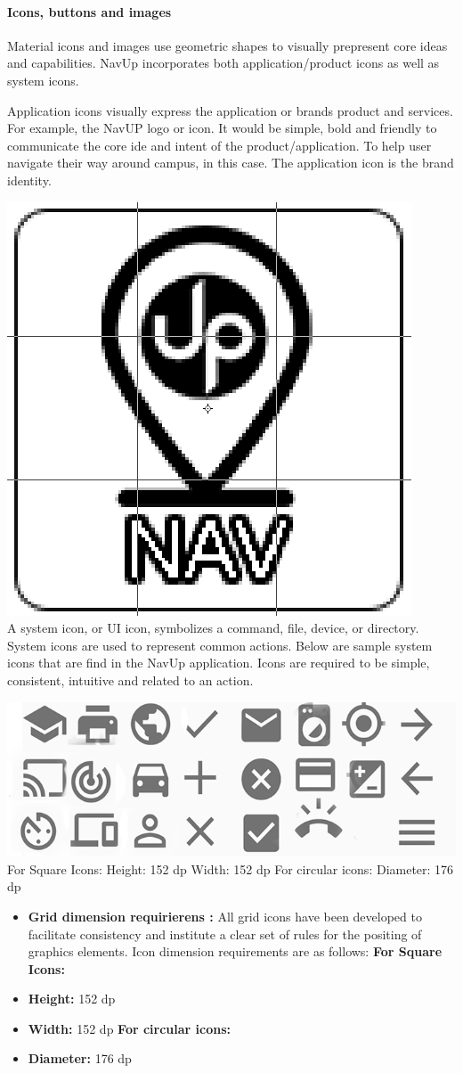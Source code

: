 \documentclass[11pt]{article}
\begin{document}
		\paragraph{Icons, buttons and images}
	
 Material icons and images use geometric shapes to visually prepresent core ideas and capabilities. NavUp incorporates both application/product icons as well as system icons. \newline

Application icons visually express the application or brands product and services. For example, the NavUP logo or icon. It would be simple, bold and friendly to communicate the core ide and intent of the product/application. To help user navigate their way around campus, in this case. The application icon is the brand identity.

	\includegraphics[width=0.2\linewidth]{Images/gridUP.png}\\[1cm]
	
	A system icon, or UI icon, symbolizes a command, file, device, or directory. System icons are used to represent common actions. Below are sample system icons that are find in the NavUp application. Icons are required to be simple, consistent, intuitive and related to an action.\newline
	
	\includegraphics[width=0.2\linewidth]{Images/icons.png}\\[1cm]
	
	
	For Square Icons:
	Height: 152 dp
	Width: 152 dp
	For circular icons:
	Diameter: 176 dp
	
	\begin{itemize}
		\item\textbf {Grid dimension requirierens :} \newline
		All grid icons have been developed to facilitate consistency and institute a clear set of rules for the positing of graphics elements. Icon dimension requirements are as follows:\newline \newline
		 \textbf{For Square Icons:} 
		\item \textbf{Height:} 152 dp
		\item \textbf{Width:} 152 dp \newline \newline
	\textbf{For circular icons:} 
		\item \textbf{Diameter:} 176 dp
	\end{itemize}
	
\end{document}
